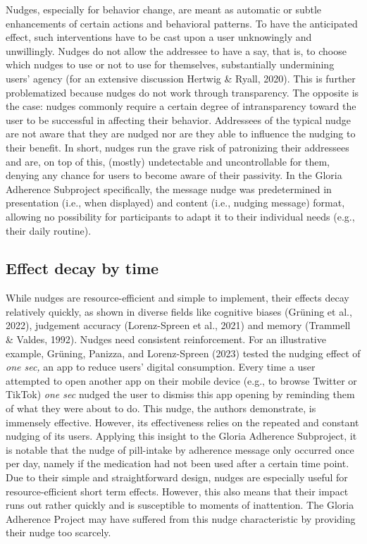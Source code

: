 \documentclass[reflection, authordate]{jote-new-article}
\begin{document}
Nudges, especially for behavior change, are meant as automatic or subtle enhancements of certain actions and behavioral patterns. To have the anticipated effect, such interventions have to be cast upon a user unknowingly and unwillingly. Nudges do not allow the addressee to have a say, that is, to choose which nudges to use or not to use for themselves, substantially undermining users’ agency (for an extensive discussion Hertwig \& Ryall, 2020). This is further problematized because nudges do not work through transparency. The opposite is the case: nudges commonly require a certain degree of intransparency toward the user to be successful in affecting their behavior. Addressees of the typical nudge are not aware that they are nudged nor are they able to influence the nudging to their benefit. In short, nudges run the grave risk of patronizing their addressees and are, on top of this, (mostly) undetectable and uncontrollable for them, denying any chance for users to become aware of their passivity. In the Gloria Adherence Subproject specifically, the message nudge was predetermined in presentation (i.e., when displayed) and content (i.e., nudging message) format, allowing no possibility for participants to adapt it to their individual needs (e.g., their daily routine).



\subsection{Effect decay by time}



While nudges are resource-efficient and simple to implement, their effects decay relatively quickly, as shown in diverse fields like cognitive biases (Grüning et al., 2022), judgement accuracy (Lorenz-Spreen et al., 2021) and memory (Trammell \& Valdes, 1992). Nudges need consistent reinforcement. For an illustrative example, Grüning, Panizza, and Lorenz-Spreen (2023) tested the nudging effect of \emph{one sec,} an app to reduce users’ digital consumption. Every time a user attempted to open another app on their mobile device (e.g., to browse Twitter or TikTok) \emph{one sec} nudged the user to dismiss this app opening by reminding them of what they were about to do. This nudge, the authors demonstrate, is immensely effective. However, its effectiveness relies on the repeated and constant nudging of its users. Applying this insight to the Gloria Adherence Subproject, it is notable that the nudge of pill-intake by adherence message only occurred once per day, namely if the medication had not been used after a certain time point. Due to their simple and straightforward design, nudges are especially useful for resource-efficient short term effects. However, this also means that their impact runs out rather quickly and is susceptible to moments of inattention. The Gloria Adherence Project may have suffered from this nudge characteristic by providing their nudge too scarcely.
\end{document}
